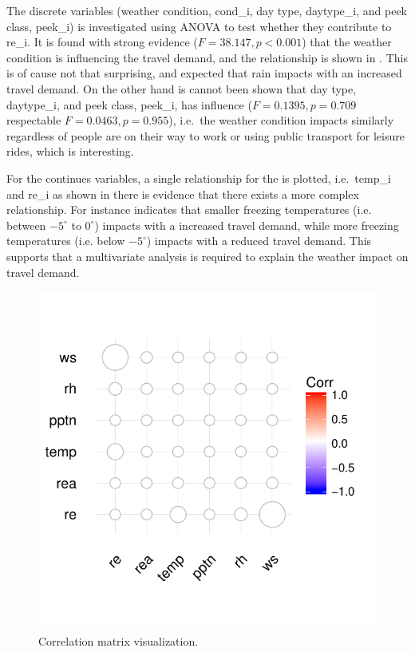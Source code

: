 The discrete variables (weather condition, \gls{cond_i}, day type, \gls{daytype_i}, and peek class, \gls{peek_i}) is investigated using ANOVA to test whether they contribute to \gls{re_i}. It is found with strong evidence ($F = 38.147, p < 0.001$) that the weather condition is influencing the travel demand, and the relationship is shown in . This is of cause not that surprising, and expected that rain impacts with an increased travel demand. On the other hand is cannot been shown that day type, \gls{daytype_i}, and peek class, \gls{peek_i}, has influence ($F =  0.1395, p = 0.709$ respectable $F =  0.0463, p = 0.955$), i.e.\ the weather condition impacts similarly regardless of people are on their way to work or using public transport for leisure rides, which is interesting.

For the continues variables, a single relationship for the  is plotted, i.e.\ \gls{temp_i} and \gls{re_i} as shown in  there is evidence that there exists a more complex relationship. For instance  indicates that smaller freezing temperatures (i.e. between $-5^{\circ}$ to $0^{\circ}$) impacts with a increased travel demand, while more freezing temperatures (i.e. below $-5^{\circ}$) impacts with a reduced travel demand. This supports that a multivariate analysis is required to explain the weather impact on travel demand.

\begin{figure}[!ht]
    \center
    \includegraphics{../plots/cor_matrix}
    \caption{Correlation matrix visualization.}
    \label{fig:cor_matrix}
\end{figure}

